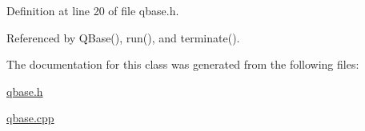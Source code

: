 Definition at line 20 of file qbase.\-h.



Referenced by Q\-Base(), run(), and terminate().



The documentation for this class was generated from the following files\-:\begin{DoxyCompactItemize}
\item 
\hyperlink{qbase_8h}{qbase.\-h}\item 
\hyperlink{qbase_8cpp}{qbase.\-cpp}\end{DoxyCompactItemize}
